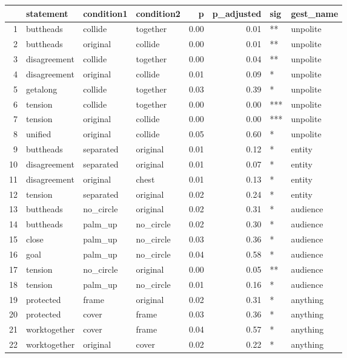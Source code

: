\begin{table}[ht]
\centering
\begin{tabular}{rlllrrll}
  \hline
 & statement & condition1 & condition2 & p & p\_adjusted & sig & gest\_name \\ 
  \hline
1 & buttheads & collide & together & 0.00 & 0.01 & ** & unpolite \\ 
  2 & buttheads & original & collide & 0.00 & 0.01 & ** & unpolite \\ 
  3 & disagreement & collide & together & 0.00 & 0.04 & ** & unpolite \\ 
  4 & disagreement & original & collide & 0.01 & 0.09 & * & unpolite \\ 
  5 & getalong & collide & together & 0.03 & 0.39 & * & unpolite \\ 
  6 & tension & collide & together & 0.00 & 0.00 & *** & unpolite \\ 
  7 & tension & original & collide & 0.00 & 0.00 & *** & unpolite \\ 
  8 & unified & original & collide & 0.05 & 0.60 & * & unpolite \\ 
  9 & buttheads & separated & original & 0.01 & 0.12 & * & entity \\ 
  10 & disagreement & separated & original & 0.01 & 0.07 & * & entity \\ 
  11 & disagreement & original & chest & 0.01 & 0.13 & * & entity \\ 
  12 & tension & separated & original & 0.02 & 0.24 & * & entity \\ 
  13 & buttheads & no\_circle & original & 0.02 & 0.31 & * & audience \\ 
  14 & buttheads & palm\_up & no\_circle & 0.02 & 0.30 & * & audience \\ 
  15 & close & palm\_up & no\_circle & 0.03 & 0.36 & * & audience \\ 
  16 & goal & palm\_up & no\_circle & 0.04 & 0.58 & * & audience \\ 
  17 & tension & no\_circle & original & 0.00 & 0.05 & ** & audience \\ 
  18 & tension & palm\_up & no\_circle & 0.01 & 0.16 & * & audience \\ 
  19 & protected & frame & original & 0.02 & 0.31 & * & anything \\ 
  20 & protected & cover & frame & 0.03 & 0.36 & * & anything \\ 
  21 & worktogether & cover & frame & 0.04 & 0.57 & * & anything \\ 
  22 & worktogether & original & cover & 0.02 & 0.22 & * & anything \\ 
   \hline
\end{tabular}
\end{table}
